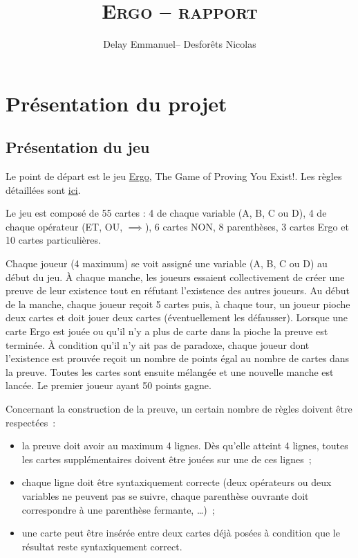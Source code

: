 \documentclass[12pt, algo]{cours}
\title{\textbf{\textsc{Ergo -- rapport}}}
\author{Delay Emmanuel-- Desforêts Nicolas}
\begin{document}
\maketitle

\tableofcontents

\section{Présentation du projet}

\subsection{Présentation du jeu}

Le point de départ est le jeu \href{https://www.catalystgamelabs.com/ergo/}{Ergo}, \og The Game of Proving You Exist!\fg. Les règles détaillées sont \href{https://www.catalystgamelabs.com/download/Ergo%20Rules%202015.pdf}{ici}.

Le jeu est composé de 55 cartes : 4 de chaque variable (A, B, C ou D), 4 de chaque opérateur (ET, OU, $\implies$), 6 cartes NON, 8 parenthèses, 3 cartes Ergo et 10 cartes particulières.

Chaque joueur (4 maximum) se voit assigné une variable (A, B, C ou D) au début du jeu. À chaque manche, les joueurs essaient collectivement de créer une preuve de leur existence tout en réfutant l'existence des autres joueurs. Au début de la manche, chaque joueur reçoit 5 cartes puis, à chaque tour, un joueur pioche deux cartes et doit jouer deux cartes (éventuellement les défausser). Lorsque une carte Ergo est jouée ou qu'il n'y a plus de carte dans la pioche la preuve est terminée. À condition qu'il n'y ait pas de paradoxe, chaque joueur dont l'existence est prouvée reçoit un nombre de points égal au nombre de cartes dans la preuve. Toutes les cartes sont ensuite mélangée et une nouvelle manche est lancée. Le premier joueur ayant 50 points gagne.

Concernant la construction de la preuve, un certain nombre de règles doivent être respectées~:
\begin{itemize}
\item la preuve doit avoir au maximum 4 lignes. Dès qu'elle atteint 4 lignes, toutes les cartes supplémentaires doivent être jouées sur une de ces lignes~;
\item chaque ligne doit être syntaxiquement correcte (deux opérateurs ou deux variables ne peuvent pas se suivre, chaque parenthèse ouvrante doit correspondre à une parenthèse fermante, \dots)~;
\item une carte peut être insérée entre deux cartes déjà posées à condition que le résultat reste syntaxiquement correct.
\end{itemize}
\end{document}
